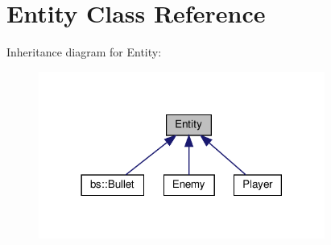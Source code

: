 \hypertarget{class_entity}{}\section{Entity Class Reference}
\label{class_entity}


Inheritance diagram for Entity\+:
\nopagebreak
\begin{figure}[H]
\begin{center}
\leavevmode
\includegraphics[width=266pt]{class_entity__inherit__graph}
\end{center}
\end{figure}
